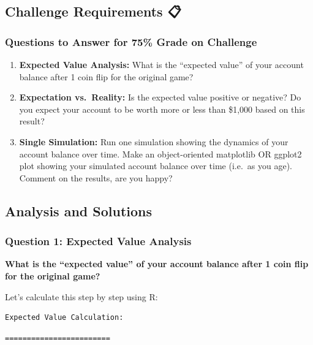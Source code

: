 \documentclass[
  letterpaper,
  DIV=11,
  numbers=noendperiod]{scrartcl}
\theoremstyle{definition}
\theoremstyle{remark}
\begin{document}
\subsection{Challenge Requirements 📋}\label{challenge-requirements}

\subsubsection{Questions to Answer for 75\% Grade on
Challenge}\label{questions-to-answer-for-75-grade-on-challenge}

\begin{enumerate}
\def\labelenumi{\arabic{enumi}.}
\item
  \textbf{Expected Value Analysis:} What is the ``expected value'' of
  your account balance after 1 coin flip for the original game?
\item
  \textbf{Expectation vs.~Reality:} Is the expected value positive or
  negative? Do you expect your account to be worth more or less than
  \$1,000 based on this result?
\item
  \textbf{Single Simulation:} Run one simulation showing the dynamics of
  your account balance over time. Make an object-oriented matplotlib OR
  ggplot2 plot showing your simulated account balance over time (i.e.~as
  you age). Comment on the results, are you happy?
\end{enumerate}

\subsection{Analysis and Solutions}\label{analysis-and-solutions}

\subsubsection{Question 1: Expected Value
Analysis}\label{question-1-expected-value-analysis}

\textbf{What is the ``expected value'' of your account balance after 1
coin flip for the original game?}

Let's calculate this step by step using R:

\begin{verbatim}
Expected Value Calculation:
\end{verbatim}

\begin{verbatim}
========================
\end{verbatim}
\end{document}
